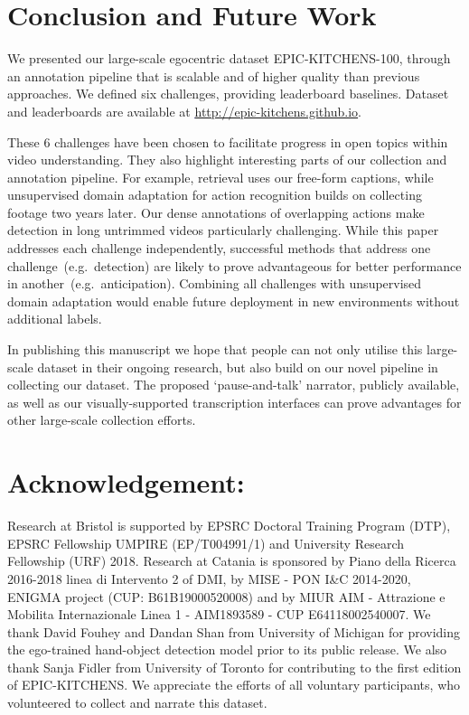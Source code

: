 \RequirePackage{amsmath} \documentclass[runningheads]{llncs}
\makeatletter
\newcommand {\newDataset} {EPIC-KITCHENS-100}
\newcommand{\annStyle} {`pause-and-talk'{}}
\newcommand*{\eg}{e.g.\@\xspace}
\makeatother
\begin{document}
\section{Conclusion and Future Work}
We presented our large-scale egocentric dataset \newDataset{}, through an annotation pipeline that is scalable and of higher quality than previous approaches. We defined six challenges, providing leaderboard baselines. Dataset and leaderboards are available at \textcolor{blue}{\underline{\url{http://epic-kitchens.github.io}}}.

These 6 challenges have been chosen to facilitate progress in open topics within video understanding. They also highlight interesting parts of our collection and annotation pipeline. For example, retrieval uses our free-form captions, while unsupervised domain adaptation for action recognition builds on collecting footage two years later. Our dense annotations of overlapping actions make detection in long untrimmed videos particularly challenging. While this paper addresses each challenge independently, successful methods that address one challenge~(\eg~detection) are likely to prove advantageous for better performance in another~(\eg~anticipation). Combining all challenges with unsupervised domain adaptation would enable future deployment in new environments without additional labels.

In publishing this manuscript we hope that people can not only utilise this large-scale dataset in their ongoing research, but also build on our novel pipeline in collecting our dataset. The proposed \annStyle{} narrator, publicly available, as well as our visually-supported transcription interfaces can prove advantages for other large-scale collection efforts.

\section*{Acknowledgement:}
Research at Bristol is supported by EPSRC Doctoral Training Program (DTP), EPSRC Fellowship UMPIRE (EP/T004991/1) and University Research Fellowship (URF) 2018. Research at Catania is sponsored by Piano della Ricerca 2016-2018 linea di Intervento 2 of DMI, by MISE - PON I\&C 2014-2020, ENIGMA project (CUP: B61B19000520008) and by MIUR AIM - Attrazione e Mobilita Internazionale Linea 1 - AIM1893589 - CUP E64118002540007. We thank David Fouhey and Dandan Shan from University of Michigan for providing the ego-trained hand-object detection model prior to its public release. We also thank Sanja Fidler from University of Toronto for contributing to the first edition of EPIC-KITCHENS. We appreciate the efforts of all voluntary participants, who volunteered to collect and narrate this dataset. 
\end{document}
